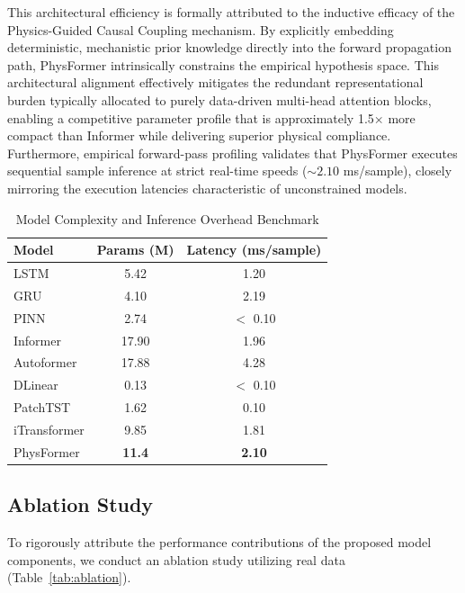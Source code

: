 This architectural efficiency is formally attributed to the inductive efficacy of the Physics-Guided Causal Coupling mechanism. By explicitly embedding deterministic, mechanistic prior knowledge directly into the forward propagation path, PhysFormer intrinsically constrains the empirical hypothesis space. This architectural alignment effectively mitigates the redundant representational burden typically allocated to purely data-driven multi-head attention blocks, enabling a competitive parameter profile that is approximately 1.5$\times$ more compact than Informer while delivering superior physical compliance. Furthermore, empirical forward-pass profiling validates that PhysFormer executes sequential sample inference at strict real-time speeds ($\sim \text{2.10}$ ms/sample), closely mirroring the execution latencies characteristic of unconstrained models.

\begin{table}[htbp]
\centering
\caption{Model Complexity and Inference Overhead Benchmark}
\label{tab:overhead}
\footnotesize
\setlength{\tabcolsep}{2pt}
\begin{tabular*}{\columnwidth}{@{\extracolsep{\fill}}lcc@{}}
\toprule
Model & Params (M) & Latency (ms/sample) \\
\midrule
LSTM & 5.42 & 1.20 \\
GRU & 4.10 & 2.19 \\
PINN & 2.74 & $<$ 0.10 \\
Informer & 17.90 & 1.96 \\
Autoformer & 17.88 & 4.28 \\
DLinear & 0.13 & $<$ 0.10 \\
PatchTST & 1.62 & 0.10 \\
iTransformer & 9.85 & 1.81 \\
PhysFormer & \textbf{11.4} & \textbf{2.10} \\
\bottomrule
\end{tabular*}
\end{table}

\subsection{Ablation Study}
\label{subsec:ablation}

To rigorously attribute the performance contributions of the proposed model components, we conduct an ablation study utilizing real data (Table~\ref{tab:ablation}).

